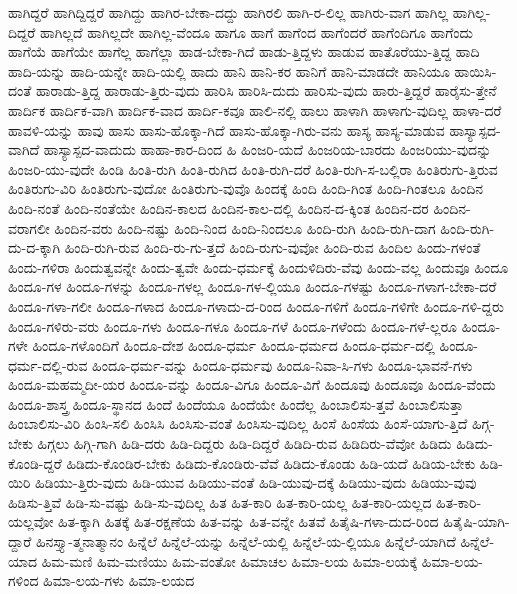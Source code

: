 {ಹಾಗಿದ್ದರೆ
ಹಾಗಿದ್ದಿದ್ದರೆ
ಹಾಗಿದ್ದು
ಹಾಗಿರ-ಬೇಕಾ-ದದ್ದು
ಹಾಗಿರಲಿ
ಹಾಗಿ-ರ-ಲಿಲ್ಲ
ಹಾಗಿರು-ವಾಗ
ಹಾಗಿಲ್ಲ
ಹಾಗಿಲ್ಲ-ದಿದ್ದರೆ
ಹಾಗಿಲ್ಲದೆ
ಹಾಗಿಲ್ಲದೇ
ಹಾಗಿಲ್ಲ-ವೆಂದೂ
ಹಾಗೂ
ಹಾಗೆ
ಹಾಗೆಂದ
ಹಾಗೆಂದರೆ
ಹಾಗೆಂದಿಗೂ
ಹಾಗೆಂದು
ಹಾಗೆಯೆ
ಹಾಗೆಯೇ
ಹಾಗೆಲ್ಲ
ಹಾಗೆಲ್ಲಾ
ಹಾಡ-ಬೇಕಾ-ಗಿದೆ
ಹಾಡು-ತ್ತಿದ್ದಳು
ಹಾಡುವ
ಹಾತೊರೆಯು-ತ್ತಿದ್ದ
ಹಾದಿ
ಹಾದಿ-ಯನ್ನು
ಹಾದಿ-ಯನ್ನೇ
ಹಾದಿ-ಯಲ್ಲಿ
ಹಾದು
ಹಾನಿ
ಹಾನಿ-ಕರ
ಹಾನಿಗೆ
ಹಾನಿ-ಮಾಡದೇ
ಹಾನಿಯೂ
ಹಾಯಿಸಿ-ದಂತೆ
ಹಾರಾಡು-ತ್ತಿದ್ದ
ಹಾರಾಡು-ತ್ತಿರು-ವುದು
ಹಾರಿಸಿ
ಹಾರಿಸಿ-ದುದು
ಹಾರಿಸು-ವುದು
ಹಾರು-ತ್ತಿದ್ದರೆ
ಹಾರೈಸು-ತ್ತೇನೆ
ಹಾರ್ದಿಕ
ಹಾರ್ದಿಕ-ವಾಗಿ
ಹಾರ್ದಿಕ-ವಾದ
ಹಾರ್ದಿ-ಕವೂ
ಹಾಲಿ-ನಲ್ಲಿ
ಹಾಲು
ಹಾಳಾಗಿ
ಹಾಳಾಗು-ವುದಿಲ್ಲ
ಹಾಳಾ-ದರೆ
ಹಾವಳಿ-ಯನ್ನು
ಹಾವು
ಹಾಸು
ಹಾಸು-ಹೊಕ್ಕಾ-ಗಿದೆ
ಹಾಸು-ಹೊಕ್ಕಾ-ಗಿರು-ವನು
ಹಾಸ್ಯ
ಹಾಸ್ಯ-ಮಾಡುವ
ಹಾಸ್ಯಾಸ್ಪದ-ವಾಗಿದೆ
ಹಾಸ್ಯಾಸ್ಪದ-ವಾದುದು
ಹಾಹಾ-ಕಾರ-ದಿಂದ
ಹಿ
ಹಿಂಜರಿ-ಯದೆ
ಹಿಂಜರಿಯ-ಬಾರದು
ಹಿಂಜರಿಯು-ವುದನ್ನು
ಹಿಂಜರಿ-ಯು-ವುದೇ
ಹಿಂಡಿ
ಹಿಂತಿ-ರುಗಿ
ಹಿಂತಿ-ರುಗಿದ
ಹಿಂತಿ-ರುಗಿ-ದರೆ
ಹಿಂತಿ-ರುಗಿ-ಸ-ಬಲ್ಲಿರಾ
ಹಿಂತಿರುಗು-ತ್ತಿರುವ
ಹಿಂತಿರುಗು-ವಿರಿ
ಹಿಂತಿರುಗು-ವುದೋ
ಹಿಂತಿರುಗು-ವುವೊ
ಹಿಂದಕ್ಕೆ
ಹಿಂದಿ
ಹಿಂದಿ-ಗಿಂತ
ಹಿಂದಿ-ಗಿಂತಲೂ
ಹಿಂದಿನ
ಹಿಂದಿ-ನಂತೆ
ಹಿಂದಿ-ನಂತೆಯೇ
ಹಿಂದಿನ-ಕಾಲದ
ಹಿಂದಿನ-ಕಾಲ-ದಲ್ಲಿ
ಹಿಂದಿನ-ದ-ಕ್ಕಿಂತ
ಹಿಂದಿನ-ದರ
ಹಿಂದಿನ-ವರಾಗಲೀ
ಹಿಂದಿನ-ವರು
ಹಿಂದಿ-ನಷ್ಟು
ಹಿಂದಿ-ನಿಂದ
ಹಿಂದಿ-ನಿಂದಲೂ
ಹಿಂದಿ-ರುಗಿ
ಹಿಂದಿ-ರುಗಿ-ದಾಗ
ಹಿಂದಿ-ರುಗಿ-ದು-ದ-ಕ್ಕಾಗಿ
ಹಿಂದಿ-ರುಗಿ-ರುವ
ಹಿಂದಿ-ರು-ಗು-ತ್ತದೆ
ಹಿಂದಿ-ರುಗು-ವುವೋ
ಹಿಂದಿ-ರುವ
ಹಿಂದಿಲ
ಹಿಂದು-ಗಳಂತೆ
ಹಿಂದು-ಗಳಿರಾ
ಹಿಂದುತ್ವವನ್ನೇ
ಹಿಂದು-ತ್ವವೇ
ಹಿಂದು-ಧರ್ಮಕ್ಕೆ
ಹಿಂದುಳಿದಿರು-ವೆವು
ಹಿಂದು-ವಲ್ಲ
ಹಿಂದುವೂ
ಹಿಂದೂ
ಹಿಂದೂ-ಗಳ
ಹಿಂದೂ-ಗಳನ್ನು
ಹಿಂದೂ-ಗಳಲ್ಲ
ಹಿಂದೂ-ಗಳ-ಲ್ಲಿಯೂ
ಹಿಂದೂ-ಗಳಷ್ಟು
ಹಿಂದೂ-ಗಳಾಗ-ಬೇಕಾ-ದರೆ
ಹಿಂದೂ-ಗಳಾ-ಗಲೀ
ಹಿಂದೂ-ಗಳಾದ
ಹಿಂದೂ-ಗಳಾದು-ದ-ರಿಂದ
ಹಿಂದೂ-ಗಳಿಗೆ
ಹಿಂದೂ-ಗಳಿಗೇ
ಹಿಂದೂ-ಗಳಿ-ದ್ದರು
ಹಿಂದೂ-ಗಳಿರು-ವರು
ಹಿಂದೂ-ಗಳು
ಹಿಂದೂ-ಗಳೂ
ಹಿಂದೂ-ಗಳೆ
ಹಿಂದೂ-ಗಳೆಂದು
ಹಿಂದೂ-ಗಳೆ-ಲ್ಲರೂ
ಹಿಂದೂ-ಗಳೇ
ಹಿಂದೂ-ಗಳೊಂದಿಗೆ
ಹಿಂದೂ-ದೇಶ
ಹಿಂದೂ-ಧರ್ಮ
ಹಿಂದೂ-ಧರ್ಮದ
ಹಿಂದೂ-ಧರ್ಮ-ದಲ್ಲಿ
ಹಿಂದೂ-ಧರ್ಮ-ದಲ್ಲಿ-ರುವ
ಹಿಂದೂ-ಧರ್ಮ-ವನ್ನು
ಹಿಂದೂ-ಧರ್ಮವು
ಹಿಂದೂ-ನಿವಾ-ಸಿ-ಗಳು
ಹಿಂದೂ-ಭಾವನೆ-ಗಳು
ಹಿಂದೂ-ಮಹಮ್ಮದೀ-ಯರ
ಹಿಂದೂ-ವನ್ನು
ಹಿಂದೂ-ವಿಗೂ
ಹಿಂದೂ-ವಿಗೆ
ಹಿಂದೂವು
ಹಿಂದೂವೂ
ಹಿಂದೂ-ವೆಂದು
ಹಿಂದೂ-ಶಾಸ್ತ್ರ
ಹಿಂದೂ-ಸ್ಥಾನದ
ಹಿಂದೆ
ಹಿಂದೆಯೂ
ಹಿಂದೆಯೇ
ಹಿಂದೆಲ್ಲ
ಹಿಂಬಾಲಿಸು-ತ್ತವೆ
ಹಿಂಬಾಲಿಸುತ್ತಾ
ಹಿಂಬಾಲಿಸು-ವಿರಿ
ಹಿಂಸಿ-ಸಲಿ
ಹಿಂಸಿಸಿ
ಹಿಂಸಿಸು-ವಂತೆ
ಹಿಂಸಿಸು-ವುದಿಲ್ಲ
ಹಿಂಸೆ
ಹಿಂಸೆಯ
ಹಿಂಸೆ-ಯಾಗು-ತ್ತಿದೆ
ಹಿಗ್ಗ-ಬೇಕು
ಹಿಗ್ಗಲು
ಹಿಗ್ಗಿ-ಗಾಗಿ
ಹಿಡಿ-ದರು
ಹಿಡಿ-ದಿದ್ದರು
ಹಿಡಿ-ದಿದ್ದರೆ
ಹಿಡಿದಿ-ರುವ
ಹಿಡಿದಿರು-ವೆವೋ
ಹಿಡಿದು
ಹಿಡಿದು-ಕೊಂಡಿ-ದ್ದರೆ
ಹಿಡಿದು-ಕೊಂಡಿರ-ಬೇಕು
ಹಿಡಿದು-ಕೊಂಡಿರು-ವೆವೆ
ಹಿಡಿದು-ಕೊಂಡು
ಹಿಡಿ-ಯದೆ
ಹಿಡಿಯ-ಬೇಕು
ಹಿಡಿ-ಯಿರಿ
ಹಿಡಿಯು-ತ್ತಿರು-ವುದು
ಹಿಡಿ-ಯುವ
ಹಿಡಿಯು-ವಂತೆ
ಹಿಡಿ-ಯುವು-ದಕ್ಕೆ
ಹಿಡಿಯು-ವುದು
ಹಿಡಿಯು-ವುವು
ಹಿಡಿಸು-ತ್ತಿವೆ
ಹಿಡಿ-ಸು-ವಷ್ಟು
ಹಿಡಿ-ಸು-ವುದಿಲ್ಲ
ಹಿತ
ಹಿತ-ಕಾರಿ
ಹಿತ-ಕಾರಿ-ಯಲ್ಲ
ಹಿತ-ಕಾರಿ-ಯಲ್ಲದ
ಹಿತ-ಕಾರಿ-ಯಲ್ಲವೋ
ಹಿತ-ಕ್ಕಾಗಿ
ಹಿತಕ್ಕೆ
ಹಿತ-ರಕ್ಷಣೆಯ
ಹಿತ-ವನ್ನು
ಹಿತ-ವನ್ನೇ
ಹಿತವೆ
ಹಿತೈಷಿ-ಗಳಾ-ದುದ-ರಿಂದ
ಹಿತೈಷಿ-ಯಾಗಿ-ದ್ದಾರೆ
ಹಿನಸ್ತ್ಯಾ-ತ್ಮನಾತ್ಮಾನಂ
ಹಿನ್ನೆಲೆ
ಹಿನ್ನೆಲೆ-ಯನ್ನು
ಹಿನ್ನೆಲೆ-ಯಲ್ಲಿ
ಹಿನ್ನೆಲೆ-ಯ-ಲ್ಲಿಯೂ
ಹಿನ್ನೆಲೆ-ಯಾಗಿದೆ
ಹಿನ್ನೆಲೆ-ಯಾದ
ಹಿಮ-ಮಣಿ
ಹಿಮ-ಮಣಿಯು
ಹಿಮ-ವಂತೋ
ಹಿಮಾಚಲ
ಹಿಮಾ-ಲಯ
ಹಿಮಾ-ಲಯಕ್ಕೆ
ಹಿಮಾ-ಲಯ-ಗಳಿಂದ
ಹಿಮಾ-ಲಯ-ಗಳು
ಹಿಮಾ-ಲಯದ
}
